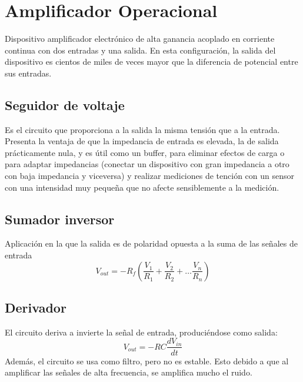 \documentclass[12pt,spanish,lettersize,twocolumn]{article}
\begin{document}
\section{Amplificador Operacional}
Dispositivo amplificador electr\'onico de alta ganancia acoplado en corriente continua con dos entradas y una salida. En esta configuraci\'on, la salida del dispositivo es cientos de miles de veces mayor que la diferencia de potencial entre sus entradas.
\subsection{Seguidor de voltaje}
\vspace{3cm}
Es el circuito que proporciona a la salida la misma tensi\'on que a la entrada. Presenta la ventaja de que la impedancia de entrada es elevada, la de salida pr\'acticamente nula, y es \'util como un buffer, para eliminar efectos de carga o para adaptar impedancias (conectar un dispositivo con gran impedancia a otro con baja impedancia y viceversa) y realizar mediciones de tenci\'on con un sensor con una intensidad muy peque\~na que no afecte sensiblemente a la medici\'on.

\subsection{Sumador inversor}
\vspace{3cm}
Aplicaci\'on en la que la salida es de polaridad opuesta a la suma de las se\~nales de entrada
\begin{equation*}
V_{out}=-R_f\left(\frac{V_1}{R_1}+\frac{V_2}{R_2}+\dots\frac{V_n}{R_n}\right)
\end{equation*}

\subsection{Derivador}
\vspace{3cm}
El circuito deriva a invierte la se\~nal de entrada, produci\'endose como salida:
\begin{equation*}
V_{out}=-RC\frac{dV_{in}}{dt}
\end{equation*}
Adem\'as, el circuito se usa como filtro, pero no es estable. Esto debido a que al amplificar las se\~nales de alta frecuencia, se amplifica mucho el ruido.
\end{document}
